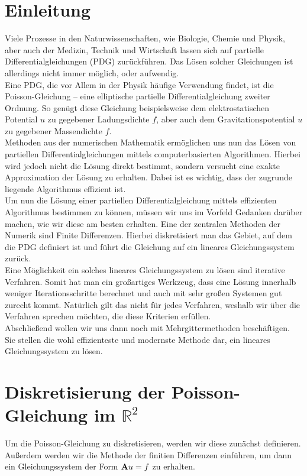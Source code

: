 \chapter{Einleitung}\label{c.Einleitung}

Viele Prozesse in den Naturwissenschaften, wie Biologie, Chemie und Physik, aber auch der Medizin, Technik und Wirtschaft lassen sich auf partielle Differentialgleichungen (PDG) zurückführen. Das Lösen solcher Gleichungen ist allerdings nicht immer möglich, oder aufwendig. \\
Eine PDG, die vor Allem in der Physik häufige Verwendung findet, ist die Poisson-Gleichung – eine elliptische partielle Differentialgleichung zweiter Ordnung. So genügt diese Gleichung beispielsweise dem elektrostatischen Potential $u$ zu gegebener Ladungsdichte $f$, aber auch dem Gravitationspotential $u$ zu gegebener Massendichte $f$. \\
Methoden aus der numerischen Mathematik ermöglichen uns nun das Lösen von partiellen Differentialgleichungen mittels computerbasierten Algorithmen. Hierbei wird jedoch nicht die Lösung direkt bestimmt, sondern versucht eine exakte Approximation der Lösung zu erhalten. Dabei ist es wichtig, dass der zugrunde liegende Algorithmus effizient ist. \\
Um nun die Lösung einer partiellen Differentialgleichung mittels effizienten Algorithmus bestimmen zu können, müssen wir uns im Vorfeld Gedanken darüber machen, wie wir diese am besten erhalten. Eine der zentralen Methoden der Numerik sind Finite Differenzen. Hierbei diskretisiert man das Gebiet, auf dem die PDG definiert ist und führt die Gleichung auf ein lineares Gleichungssystem zurück. \\
Eine Möglichkeit ein solches lineares Gleichungssystem zu lösen sind iterative Verfahren. Somit hat man ein großartiges Werkzeug, dass eine Lösung innerhalb weniger Iterationsschritte berechnet und auch mit sehr großen Systemen gut zurecht kommt. Natürlich gilt das nicht für jedes Verfahren, weshalb wir über die Verfahren sprechen möchten, die diese Kriterien erfüllen. \\
Abschließend wollen wir uns dann noch mit Mehrgittermethoden beschäftigen. Sie stellen die wohl effizienteste und modernste Methode dar, ein lineares Gleichungssystem zu lösen.


\chapter{Diskretisierung der Poisson-Gleichung im $\mathbb{R}^{2}$}\label{c.Diskretisierte Poisson-Gleichung}
Um die Poisson-Gleichung zu diskretisieren, werden wir diese zunächst definieren. Außerdem werden wir die Methode der finitien Differenzen einführen, um dann ein Gleichungssystem der Form ${\textbf{A}}u = f$ zu erhalten.

